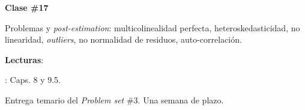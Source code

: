 \documentclass[letterpaper]{article}
\renewenvironment{itemize}{
  \begin{list}{}{
    \setlength{\leftmargin}{1.5em}
  }
}{
  \end{list}
}
\begin{document}
\begin{enumerate}
\begin{itemize}
\begin{itemize}
\begin{itemize}
							\end{itemize}
					\end{itemize}
			\end{itemize}






			\begin{itemize} 
				\item[$\bullet$] {\bf Clase \#17}
					\begin{itemize} 
						\item[$\circ$] Problemas y \emph{post-estimation}: multicolinealidad perfecta, heteroskedasticidad, no linearidad, \emph{outliers}, no normalidad de residuos, auto-correlaci\'on. %
						\item[$\circ$] {\bf Lecturas}: 
						\begin{itemize}
						\item[$\diamond$] \textcite{Wooldridge2010}: Caps. 8 y 9.5.
						\end{itemize}
					\end{itemize}
			\end{itemize}




\item[{\color{red}\Pointinghand}] Entrega temario del \emph{Problem set} \#3. Una semana de plazo.



\end{enumerate}
\end{document}
